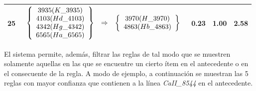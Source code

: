 \begin{longtable}{| c | l | c | c | c |}
25 & $\begin{array}{c c c}\left\{\begin{array}{c}3935 (K\_3935) \\ 4103 (Hd\_4103) \\ 4342 (Hg\_4342) \\ 6565 (Ha\_6565)\end{array}\right\} & \Rightarrow & \left\{\begin{array}{c}3970 (H\_3970) \\ 4863 (Hb\_4863)\end{array}\right\}\end{array}$ & 0.23 & 1.00 & 2.58 \\ \hline
\end{longtable}

El sistema permite, además, filtrar las reglas de tal modo que se muestren solamente aquellas en las que se encuentre un cierto ítem en el antecedente o en el consecuente de la regla. A modo de ejemplo, a continuación se muestran las 5 reglas con mayor confianza que contienen a la línea \textit{CaII\_8544} en el antecedente.

